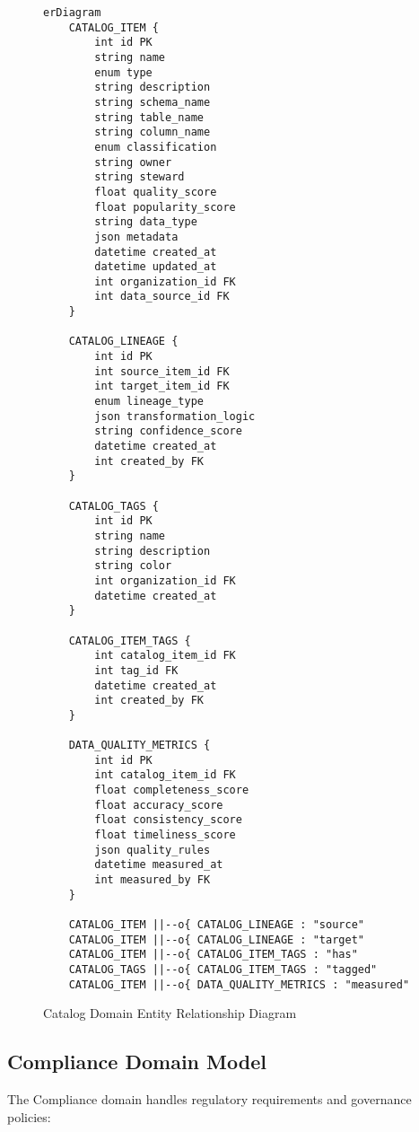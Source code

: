 \documentclass[12pt,a4paper]{article}
\begin{document}
\begin{figure}[H]
\centering
\begin{verbatim}
erDiagram
    CATALOG_ITEM {
        int id PK
        string name
        enum type
        string description
        string schema_name
        string table_name
        string column_name
        enum classification
        string owner
        string steward
        float quality_score
        float popularity_score
        string data_type
        json metadata
        datetime created_at
        datetime updated_at
        int organization_id FK
        int data_source_id FK
    }
    
    CATALOG_LINEAGE {
        int id PK
        int source_item_id FK
        int target_item_id FK
        enum lineage_type
        json transformation_logic
        string confidence_score
        datetime created_at
        int created_by FK
    }
    
    CATALOG_TAGS {
        int id PK
        string name
        string description
        string color
        int organization_id FK
        datetime created_at
    }
    
    CATALOG_ITEM_TAGS {
        int catalog_item_id FK
        int tag_id FK
        datetime created_at
        int created_by FK
    }
    
    DATA_QUALITY_METRICS {
        int id PK
        int catalog_item_id FK
        float completeness_score
        float accuracy_score
        float consistency_score
        float timeliness_score
        json quality_rules
        datetime measured_at
        int measured_by FK
    }
    
    CATALOG_ITEM ||--o{ CATALOG_LINEAGE : "source"
    CATALOG_ITEM ||--o{ CATALOG_LINEAGE : "target"
    CATALOG_ITEM ||--o{ CATALOG_ITEM_TAGS : "has"
    CATALOG_TAGS ||--o{ CATALOG_ITEM_TAGS : "tagged"
    CATALOG_ITEM ||--o{ DATA_QUALITY_METRICS : "measured"
\end{verbatim}
\caption{Catalog Domain Entity Relationship Diagram}
\end{figure}

\subsection{Compliance Domain Model}

The Compliance domain handles regulatory requirements and governance policies:
\end{document}
